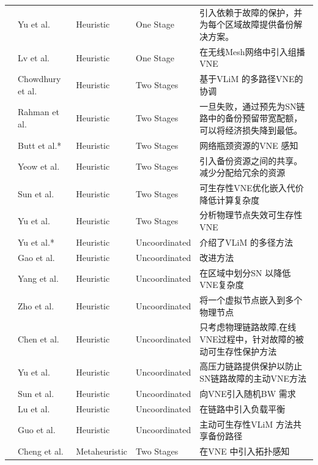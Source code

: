 \begin{longtable}[h]{@{}lm{}m{}m{}m{}}
 & Yu et al.  \cite{yu2010survivable}  & Heuristic & One Stage & 引入依赖于故障的保护，并为每个区域故障提供备份解决方案。\\
 & Lv et al.  \cite{lv2012multicast}  & Heuristic & One Stage & 在无线Mesh网络中引入组播VNE\\
 & Chowdhury et al.\cite{chowdhury2012vineyard,chowdhury2009virtual}  & Heuristic & Two Stages & 基于VLiM 的多路径VNE的协调\\
 & Rahman et al.  \cite{rahman2010survivable}  & Heuristic & Two Stages & 一旦失败，通过预先为SN链路中的备份预留带宽配额，可以将经济损失降到最低。\\
 & Butt et al.*  \cite{butt2010topology}  & Heuristic & Two Stages & 网络瓶颈资源的VNE 感知\\
 & Yeow et al.  \cite{yeow2010designing}  & Heuristic & Two Stages & 引入备份资源之间的共享。减少分配给冗余的资源\\
 & Sun et al.  \cite{sun2011framework}  & Heuristic &  Two Stages & 可生存性VNE优化嵌入代价降低计算复杂度\\
 & Yu et al.  \cite{yu2011cost}  & Heuristic & Two Stages & 分析物理节点失效可生存性VNE\\
 & Yu et al.*  \cite{yu2008rethinking}  & Heuristic & Uncoordinated & 介绍了VLiM 的多径方法\\
 & Gao et al.  \cite{gao2010new}  & Heuristic & Uncoordinated & 改进方法\cite{chowdhury2009virtual} \\
 & Yang et al.  \cite{yang2010vlb}  & Heuristic & Uncoordinated & 在区域中划分SN 以降低VNE复杂度\\
 & Zho et al.  \cite{zhou2010virtual}  & Heuristic & Uncoordinated & 将一个虚拟节点嵌入到多个物理节点
\\
 & Chen et al.  \cite{chen2010resilient}  & Heuristic & Uncoordinated & 只考虑物理链路故障,在线VNE过程中，针对故障的被动可生存性保护方法\\
 & Yu et al.  \cite{yang2011rmap}  & Heuristic & Uncoordinated & 高压力链路提供保护以防止SN链路故障的主动VNE方法\\
 & Sun et al.  \cite{sun2012exploring}  & Heuristic & Uncoordinated & 向VNE引入随机BW 需求\\
 & Lu et al.  \cite{bo2011adaptive}  & Heuristic & Uncoordinated & 在链路中引入负载平衡\\
 & Guo et al.  \cite{guo2011shared}  & Heuristic & Uncoordinated & 主动可生存性VLiM 方法共享备份路径\\
 & Cheng et al.  \cite{cheng2011virtual}  & Metaheuristic & Two Stages & 在VNE 中引入拓扑感知\\

\end{longtable}
